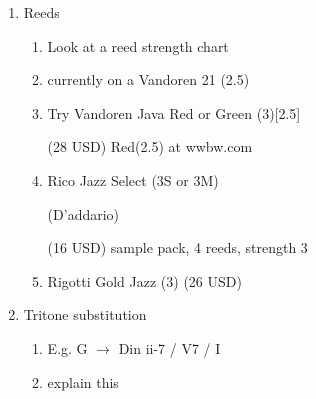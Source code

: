 \begin{enumerate}

\item Reeds
  \begin{enumerate}
  \item Look at a reed strength chart
  \item currently on a Vandoren 21 (2.5)
  \item Try Vandoren Java Red or Green (3)[2.5]

    (28 USD) Red(2.5) at wwbw.com

  \item Rico Jazz Select (3S or 3M)

    (D'addario)

    (16 USD) sample pack, 4 reeds, strength 3
  \item Rigotti Gold Jazz (3) (26 USD)
  \end{enumerate}
\item Tritone substitution
\begin{enumerate}
\item E.g. G $\to$ D\mflat in ii-7 / V7 / I
\item explain this
\end{enumerate}
\end{enumerate}



